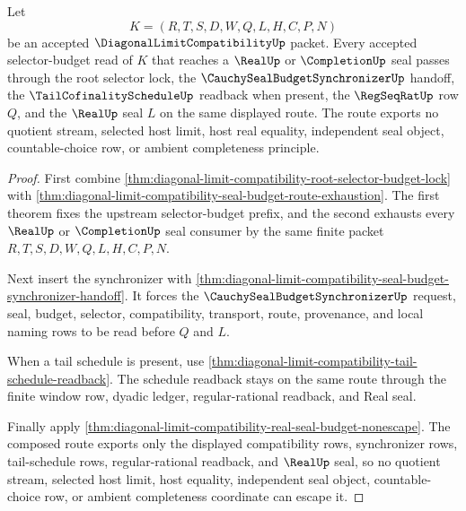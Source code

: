 \begin{theorem}
\label{thm:diagonal-limit-compatibility-selector-lock-seal-route-exhaustion}
Let
$$
K=(R,T,S,D,W,Q,L,H,C,P,N)
$$
be an accepted $\DiagonalLimitCompatibilityUp$ packet. Every accepted selector-budget read of $K$ that reaches a $\RealUp$ or $\CompletionUp$ seal passes through the root selector lock, the $\CauchySealBudgetSynchronizerUp$ handoff, the $\TailCofinalityScheduleUp$ readback when present, the $\RegSeqRatUp$ row $Q$, and the $\RealUp$ seal $L$ on the same displayed route. The route exports no quotient stream, selected host limit, host real equality, independent seal object, countable-choice row, or ambient completeness principle.
\end{theorem}
\begin{proof}
First combine \autoref{thm:diagonal-limit-compatibility-root-selector-budget-lock} with \autoref{thm:diagonal-limit-compatibility-seal-budget-route-exhaustion}. The first theorem fixes the upstream selector-budget prefix, and the second exhausts every $\RealUp$ or $\CompletionUp$ seal consumer by the same finite packet $R,T,S,D,W,Q,L,H,C,P,N$.

Next insert the synchronizer with \autoref{thm:diagonal-limit-compatibility-seal-budget-synchronizer-handoff}. It forces the $\CauchySealBudgetSynchronizerUp$ request, seal, budget, selector, compatibility, transport, route, provenance, and local naming rows to be read before $Q$ and $L$.

When a tail schedule is present, use \autoref{thm:diagonal-limit-compatibility-tail-schedule-readback}. The schedule readback stays on the same route through the finite window row, dyadic ledger, regular-rational readback, and Real seal.

Finally apply \autoref{thm:diagonal-limit-compatibility-real-seal-budget-nonescape}. The composed route exports only the displayed compatibility rows, synchronizer rows, tail-schedule rows, regular-rational readback, and $\RealUp$ seal, so no quotient stream, selected host limit, host equality, independent seal object, countable-choice row, or ambient completeness coordinate can escape it.
\end{proof}


